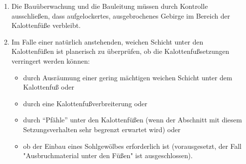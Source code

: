 \documentclass[fleqn,twoside]{article}
\begin{document}
\begin{small}
\begin{itemize}
\begin{enumerate}
\begin{enumerate}
            \item Die Bauüberwachung und die Bauleitung müssen durch Kontrolle ausschließen, dass aufgelockertes, ausgebrochenes Gebirge im Bereich der Kalottenfüße verbleibt.
            \item Im Falle einer natürlich anstehenden, weichen Schicht unter den Kalottenfüßen ist planerisch zu überprüfen, ob die Kalottenfußsetzungen verringert werden können:
            \begin{itemize}
                \item durch Ausräumung einer gering mächtigen weichen Schicht unter dem Kalottenfuß oder
                \item durch eine Kalottenfußverbreiterung oder
                \item durch \enquote{Pfähle} unter den Kalottenfüßen (wenn der Abschnitt mit diesem Setzungsverhalten sehr begrenzt erwartet wird) oder
                \item ob der Einbau eines Sohlgewölbes erforderlich ist (vorausgesetzt, der Fall "Ausbruchmaterial unter den Füßen" ist ausgeschlossen).
            \end{itemize}
            \end{enumerate}
    \end{enumerate}
    

\end{itemize}
\end{small}
\end{document}

